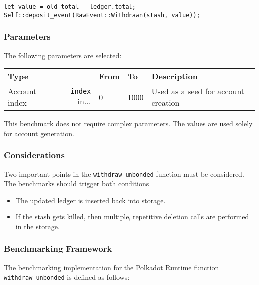 \documentclass[11pt,a4paper]{article}
\begin{document}
\begin{verbatim}
let value = old_total - ledger.total;
Self::deposit_event(RawEvent::Withdrawn(stash, value));
\end{verbatim}

\subsubsection*{Parameters}
The following parameters are selected:

\begin{center}
  \begin{tabular}{ l|r l l l }
    \textbf{Type} && \textbf{From} & \textbf{To} & \textbf{Description}\\
    \hline
    Account index & \verb|index| in... & 0 & 1000 & Used as a seed for account
    creation \\
  \end{tabular}
\end{center}

This benchmark does not require complex parameters. The values are used solely
for account generation.

\subsubsection{Considerations}

Two important points in the \verb|withdraw_unbonded| function must be considered.
The benchmarks should trigger both conditions

\begin{itemize}
  \item The updated ledger is inserted back into storage.
  \item If the stash gets killed, then multiple, repetitive deletion calls are
  performed in the storage.
\end{itemize}

\subsubsection{Benchmarking Framework}

The benchmarking implementation for the Polkadot Runtime function
\verb|withdraw_unbonded| is defined as follows:
\newline
\end{document}
